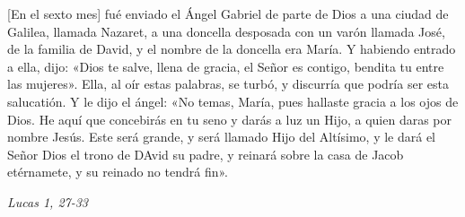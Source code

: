 \documentclass[../../devocionario.tex]{subfiles}
\begin{document}
    [En el sexto mes] fué enviado el Ángel Gabriel de parte de Dios a una ciudad de Galilea, llamada Nazaret, 
    a una doncella desposada con un varón llamada José, de la familia de David, y el nombre de la doncella era María. 
    Y habiendo entrado a ella, dijo: «Dios te salve, llena de gracia, el Señor es contigo, bendita tu entre las mujeres». 
    Ella, al oír estas palabras, se turbó, y discurría que podría ser esta salucatión. 
    Y le dijo el ángel: «No temas, María, pues hallaste gracia a los ojos de Dios. He aquí que concebirás en tu seno y darás a luz un Hijo, 
    a quien daras por nombre Jesús. Este será grande, y será llamado Hijo del Altísimo, y le dará el Señor Dios el trono de DAvid su padre, 
    y reinará sobre la casa de Jacob etérnamete, y su reinado no tendrá fin».

    \begin{flushright}
        \textit{Lucas 1, 27-33}
    \end{flushright}
\end{document}
